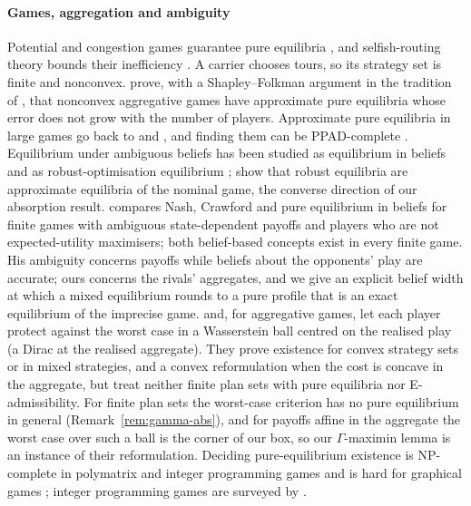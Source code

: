 \documentclass[preprint,12pt]{elsarticle}
\theoremstyle{definition}
\theoremstyle{remark}
\begin{document}
\paragraph{Games, aggregation and ambiguity} Potential and congestion games guarantee pure equilibria \citep{Rosenthal1973,Monderer1996}, and selfish-routing theory bounds their inefficiency \citep{Roughgarden2002,Acemoglu2007,Cominetti2009}. A carrier chooses tours, so its strategy set is finite and nonconvex. \citet{Liu2023} prove, with a Shapley--Folkman argument in the tradition of \citet{Starr1969}, that nonconvex aggregative games have approximate pure equilibria whose error does not grow with the number of players. Approximate pure equilibria in large games go back to \citet{Kalai2004} and \citet{Azrieli2013}, and finding them can be PPAD-complete \citep{Goldberg2023}. Equilibrium under ambiguous beliefs has been studied as equilibrium in beliefs \citep{Lo1996,Marinacci2000} and as robust-optimisation equilibrium \citep{Aghassi2006,Crespi2025}; \citet{Crespi2025} show that robust equilibria are approximate equilibria of the nominal game, the converse direction of our absorption result. \citet{Beauchene2016} compares Nash, Crawford and pure equilibrium in beliefs for finite games with ambiguous state-dependent payoffs and players who are not expected-utility maximisers; both belief-based concepts exist in every finite game. His ambiguity concerns payoffs while beliefs about the opponents' play are accurate; ours concerns the rivals' aggregates, and we give an explicit belief width at which a mixed equilibrium rounds to a pure profile that is an exact equilibrium of the imprecise game. \citet{Lanzetti2025} and, for aggregative games, \citet{Feik2026} let each player protect against the worst case in a Wasserstein ball centred on the realised play (a Dirac at the realised aggregate). They prove existence for convex strategy sets or in mixed strategies, and a convex reformulation when the cost is concave in the aggregate, but treat neither finite plan sets with pure equilibria nor E-admissibility. For finite plan sets the worst-case criterion has no pure equilibrium in general (Remark~\ref{rem:gamma-abs}), and for payoffs affine in the aggregate the worst case over such a ball is the corner of our box, so our $\Gamma$-maximin lemma is an instance of their reformulation. Deciding pure-equilibrium existence is NP-complete in polymatrix and integer programming games \citep{Apt2022,Carvalho2022} and is hard for graphical games \citep{Gottlob2005}; integer programming games are surveyed by \citet{Carvalho2025FTO}.
\end{document}
